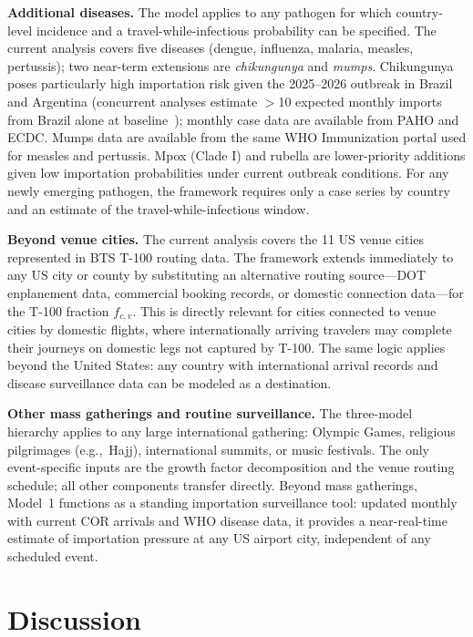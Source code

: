 \documentclass[12pt]{article}
\begin{document}
\textbf{Additional diseases.}
The model applies to any pathogen for which country-level incidence
and a travel-while-infectious probability can be specified. The
current analysis covers five diseases (dengue, influenza, malaria,
measles, pertussis); two near-term extensions are \textit{chikungunya}
and \textit{mumps}. Chikungunya poses particularly high importation
risk given the 2025--2026 outbreak in Brazil and Argentina (concurrent
analyses estimate $>$10 expected monthly imports from Brazil alone at
baseline~\cite{epistorm2026}); monthly case data are available from
PAHO and ECDC. Mumps data are available from the same WHO Immunization
portal used for measles and pertussis. Mpox (Clade I) and rubella
are lower-priority additions given low importation probabilities under
current outbreak conditions. For any newly emerging pathogen, the
framework requires only a case series by country and an estimate of
the travel-while-infectious window.

\textbf{Beyond venue cities.}
The current analysis covers the 11 US venue cities represented in
BTS T-100 routing data. The framework extends immediately to any
US city or county by substituting an alternative routing
source---DOT enplanement data, commercial booking records, or
domestic connection data---for the T-100 fraction $f_{c,v}$.
This is directly relevant for cities connected to venue cities by
domestic flights, where internationally arriving travelers may
complete their journeys on domestic legs not captured by T-100. The
same logic applies beyond the United States: any country with
international arrival records and disease surveillance data can be
modeled as a destination.

\textbf{Other mass gatherings and routine surveillance.}
The three-model hierarchy applies to any large international
gathering: Olympic Games, religious pilgrimages (e.g.,\ Hajj),
international summits, or music festivals. The only event-specific
inputs are the growth factor decomposition and the venue routing
schedule; all other components transfer directly. Beyond mass
gatherings, Model~1 functions as a standing importation surveillance
tool: updated monthly with current COR arrivals and WHO disease
data, it provides a near-real-time estimate of importation pressure
at any US airport city, independent of any scheduled event.

\section*{Discussion}
\end{document}
